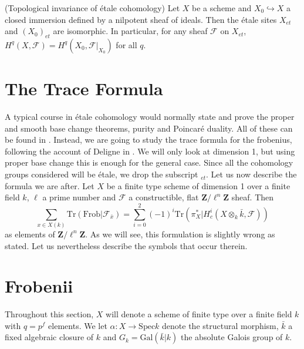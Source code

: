 \begin{proposition}
\label{proposition-topological-invariance}
(Topological invariance of \'etale cohomology)
Let $X$ be a scheme and $X_0\hookrightarrow X$ a closed immersion defined by a 
nilpotent sheaf of ideals. Then the \'etale sites $X_{et}$ and $(X_0)_{et}$ are 
isomorphic. In particular, for any sheaf $\mathcal{F}$ on $X_{et}$, $H^q(X, 
\mathcal{F}) = H^q(X_0, \mathcal{F}|_{X_0})$ for all $q$.
\end{proposition}




\section{The Trace Formula}


A typical course in \'etale cohomology would normally state and prove the 
proper and smooth base change theorems, purity and Poincar\'e duality. All of 
these can be found in \cite[Arcata]{SGA4.5}. Instead, we are going to study the 
trace formula for the frobenius, following the account of Deligne in 
\cite[Rapport]{SGA4.5}. We will only look at dimension 1, but using proper base 
change this is enough for the general case. Since all the cohomology groups 
considered will be \'etale, we drop the subscript $_{et}$. Let us now describe 
the formula we are after. Let $X$ be a finite type scheme of dimension 1 over a 
finite field $k$, $\ell$ a prime number and $\mathcal{F}$ a constructible, flat 
$\mathbf{Z}/\ell^n\mathbf{Z}$ sheaf. Then
\begin{equation*} \tag{$*$} \label{eq:TraceFormula}
\sum_{x \in X(k)} \text{Tr}(\text{Frob} | \mathcal{F}_{\bar x}) = \sum_{i=0}^2 
(-1)^i \text{Tr}(\pi_X^* | H^i_c(X\otimes_k \bar k, \mathcal{F}))
\end{equation*}
as elements of $\mathbf{Z}/\ell^n\mathbf{Z}$. As we will see, this formulation 
is slightly wrong as stated. Let us nevertheless describe the symbols that 
occur therein.

\section{Frobenii}
\label{subsection:Frobenii}

Throughout this section, $X$ will denote a scheme of finite type over a finite 
field $k$ with $q = p^f$ elements. We let $\alpha : X \to \text{Spec} k$ denote 
the structural morphism, $\bar k$ a fixed algebraic closure of $k$ and $G_k = 
\text{Gal}(\bar k | k)$ the absolute Galois group of $k$.

